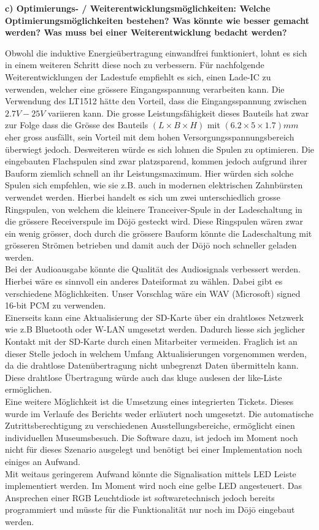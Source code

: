 \textbf{c) Optimierungs- / Weiterentwicklungsmöglichkeiten: Welche Optimierungsmöglichkeiten bestehen? Was könnte wie besser gemacht werden? Was muss bei einer Weiterentwicklung bedacht werden?}

Obwohl die induktive Energieübertragung einwandfrei funktioniert, lohnt es sich in einem weiteren Schritt diese noch zu verbessern. Für nachfolgende Weiterentwicklungen der Ladestufe empfiehlt es sich, einen Lade-IC zu verwenden, welcher eine grössere Eingangsspannung verarbeiten kann. Die Verwendung des LT1512 hätte den Vorteil, dass die Eingangsspannung zwischen $2.7V - 25V$ variieren kann. Die grosse Leistungsfähigkeit dieses Bauteils hat zwar zur Folge dass die Grösse des Bauteils $(L \times B \times H)$ mit $(6.2\times 5\times 1.7)mm$ eher gross ausfällt, sein Vorteil mit dem hohen Versorgungsspannungsbereich überwiegt jedoch. Desweiteren würde es sich lohnen die Spulen zu optimieren. Die eingebauten Flachspulen sind zwar platzsparend, kommen jedoch aufgrund ihrer Bauform ziemlich schnell an ihr Leistungsmaximum. Hier würden sich solche Spulen sich empfehlen, wie sie z.B. auch in modernen elektrischen Zahnbürsten verwendet werden. Hierbei handelt es sich um zwei unterschiedlich grosse Ringspulen, von welchem die kleinere Tranceiver-Spule in der Ladeschaltung in die grössere Receiverspule  im Dōjō gesteckt wird. Diese Ringspulen wären zwar ein wenig grösser, doch durch die grössere Bauform könnte die Ladeschaltung mit grösseren Strömen betrieben und damit auch der Dōjō noch schneller geladen werden.\\
Bei der Audioausgabe könnte die Qualität des Audiosignals verbessert werden. Hierbei wäre es sinnvoll ein anderes Dateiformat zu wählen. Dabei gibt es verschiedene Möglichkeiten. Unser Vorschlag wäre ein WAV (Microsoft) signed 16-bit PCM zu verwenden.\\
Einerseits kann eine Aktualisierung der SD-Karte über ein drahtloses Netzwerk wie z.B Bluetooth oder W-LAN umgesetzt werden. Dadurch liesse sich jeglicher Kontakt mit der SD-Karte durch einen Mitarbeiter vermeiden. Fraglich ist an dieser Stelle jedoch in welchem Umfang Aktualisierungen vorgenommen werden, da die drahtlose Datenübertragung nicht unbegrenzt Daten übermitteln kann. Diese drahtlose Übertragung würde auch das kluge auslesen der like-Liste ermöglichen.\\
Eine weitere Möglichkeit ist die Umsetzung eines integrierten Tickets. Dieses wurde im Verlaufe des Berichts weder erläutert noch umgesetzt. Die automatische Zutrittsberechtigung zu verschiedenen Ausstellungsbereiche, ermöglicht einen individuellen Museumsbesuch. Die Software dazu, ist jedoch im Moment noch nicht für dieses Szenario ausgelegt und benötigt bei einer Implementation noch einiges an Aufwand.\\
Mit weitaus geringerem Aufwand könnte die Signalisation mittels LED Leiste implementiert werden. Im Moment wird noch eine gelbe LED angesteuert. Das Ansprechen einer RGB Leuchtdiode ist softwaretechnisch jedoch bereits programmiert und müsste für die Funktionalität nur noch im Dōjō eingebaut werden.